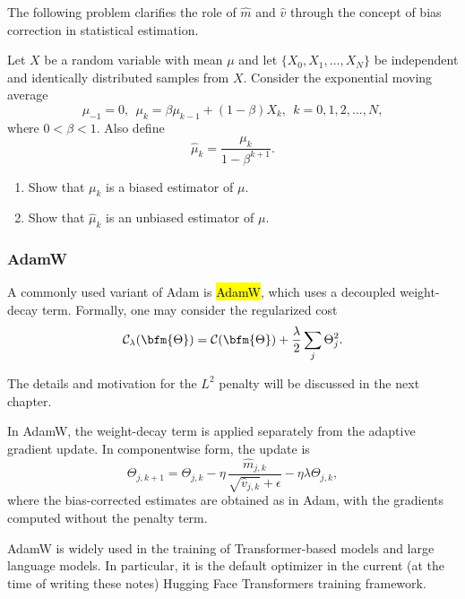 The following problem clarifies the role of $\widehat{m}$ and $\widehat{v}$ through the concept of bias correction in statistical estimation.
\begin{problem}
Let $X$ be a random variable with mean $\mu$ and let $\{X_0,X_1,\ldots, X_N\}$ be independent and identically distributed samples from $X$. Consider the exponential moving average 
$$
\mu_{-1}=0,~~\mu_{k} = \beta \mu_{k-1} + (1-\beta) X_{k},~~k=0,1,2,\ldots, N,
$$
where $0< \beta < 1$.  Also define
$$
\widehat{\mu}_k = \frac{\mu_k}{1-\beta^{k+1}}.
$$
\begin{enumerate}
\item Show that $\mu_k$ is a biased estimator of $\mu$. 
\item Show that $\widehat{\mu}_k$ is an unbiased estimator of $\mu$.
\end{enumerate}

\end{problem}

\subsubsection{AdamW}
A commonly used variant of Adam is \hl{AdamW}, which uses a decoupled weight-decay term. Formally, one may
consider the regularized cost
$$
\mathcal{C}_\lambda(\bfm{\Theta})
=
\mathcal{C}(\bfm{\Theta})
+
\frac{\lambda}{2}
\sum_j \Theta_j^2.
$$
\begin{note}
The details and motivation for the $L^2$ penalty will be discussed in the
next chapter.
\end{note}
In AdamW, the weight-decay term is applied separately from the adaptive
gradient update. In componentwise form, the update is
$$
\Theta_{j,k+1}
=
\Theta_{j,k}
-
\eta\,
\frac{\widehat m_{j,k}}
{\sqrt{\widehat v_{j,k}}+\epsilon}
-
\eta\lambda\Theta_{j,k},
$$
where the bias-corrected estimates are obtained as in Adam, with the gradients computed without the penalty term.

AdamW is widely used in the training of Transformer-based models and large language models. In particular, it is the default optimizer in the current (at the time of writing these notes) Hugging Face Transformers training framework.
